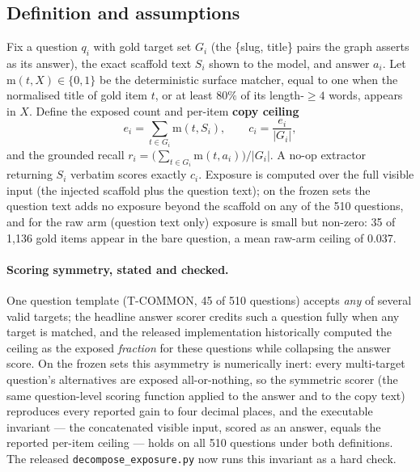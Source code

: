 \documentclass[10pt,twocolumn]{article}
\begin{document}
\subsection{Definition and assumptions}
Fix a question $q_i$ with gold target set $G_i$ (the \{slug, title\} pairs the graph asserts as its answer), the exact scaffold text $S_i$ shown to the model, and answer $a_i$. Let $\mathrm{m}(t,X)\in\{0,1\}$ be the deterministic surface matcher, equal to one when the normalised title of gold item $t$, or at least $80\%$ of its length-$\geq4$ words, appears in $X$. Define the exposed count and per-item \textbf{copy ceiling}
\[
  e_i=\sum_{t\in G_i}\mathrm{m}(t,S_i),\qquad
  c_i=\frac{e_i}{|G_i|},
\]
and the grounded recall $r_i=\bigl(\sum_{t\in G_i}\mathrm{m}(t,a_i)\bigr)/|G_i|$. A no-op extractor returning $S_i$ verbatim scores exactly $c_i$. Exposure is computed over the full visible input (the injected scaffold plus the question text); on the frozen sets the question text adds no exposure beyond the scaffold on any of the 510 questions, and for the raw arm (question text only) exposure is small but non-zero: 35 of 1{,}136 gold items appear in the bare question, a mean raw-arm ceiling of 0.037.

\paragraph{Scoring symmetry, stated and checked.} One question template (T-COMMON, 45 of 510 questions) accepts \emph{any} of several valid targets; the headline answer scorer credits such a question fully when any target is matched, and the released implementation historically computed the ceiling as the exposed \emph{fraction} for these questions while collapsing the answer score. On the frozen sets this asymmetry is numerically inert: every multi-target question's alternatives are exposed all-or-nothing, so the symmetric scorer (the same question-level scoring function applied to the answer and to the copy text) reproduces every reported gain to four decimal places, and the executable invariant --- the concatenated visible input, scored as an answer, equals the reported per-item ceiling --- holds on all 510 questions under both definitions. The released \texttt{decompose\_exposure.py} now runs this invariant as a hard check.
\end{document}
